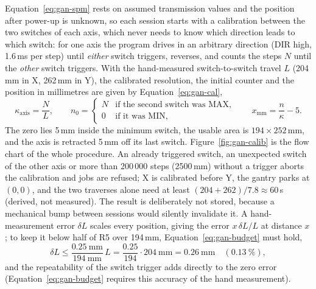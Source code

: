 Equation~\ref{eq:gan-spm} rests on assumed transmission values and the position after power-up is unknown, so each session starts with a calibration between the two switches of each axis, which never needs to know which direction leads to which switch: for one axis the program drives in an arbitrary direction (DIR high, 1.6\,ms per step) until \emph{either} switch triggers, reverses, and counts the steps $N$ until the \emph{other} switch triggers.
With the hand-measured switch-to-switch travel $L$ (204\,mm in X, 262\,mm in Y), the calibrated resolution, the initial counter and the position in millimetres are given by Equation~\ref{eq:gan-cal},
\begin{equation}
\kappa_{\mathrm{axis}}=\frac{N}{L},\qquad n_0=\begin{cases}N&\text{if the second switch was MAX,}\\0&\text{if it was MIN,}\end{cases}\qquad x_{\mathrm{mm}}=\frac{n}{\kappa}-5 .
\label{eq:gan-cal}
\end{equation}
The zero lies 5\,mm inside the minimum switch, the usable area is $194\times252$\,mm, and the axis is retracted 5\,mm off its last switch.
Figure~\ref{fig:gan-calib} is the flow chart of the whole procedure.
An already triggered switch, an unexpected switch of the other axis or more than 200\,000 steps (2500\,mm) without a trigger aborts the calibration and jobs are refused; X is calibrated before Y, the gantry parks at $(0,0)$, and the two traverses alone need at least $(204+262)/7.8\approx60$\,s (derived, not measured).
The result is deliberately not stored, because a mechanical bump between sessions would silently invalidate it.
A hand-measurement error $\delta L$ scales every position, giving the error $x\,\delta L/L$ at distance $x$; to keep it below half of R5 over 194\,mm, Equation~\ref{eq:gan-budget} must hold,
\begin{equation}
\delta L\le\frac{0.25\ \mathrm{mm}}{194\ \mathrm{mm}}\,L=\frac{0.25}{194}\cdot204\ \mathrm{mm}=0.26\ \mathrm{mm}\quad(0.13\ \%),
\label{eq:gan-budget}
\end{equation}
and the repeatability of the switch trigger adds directly to the zero error (Equation~\ref{eq:gan-budget} requires this accuracy of the hand measurement).

